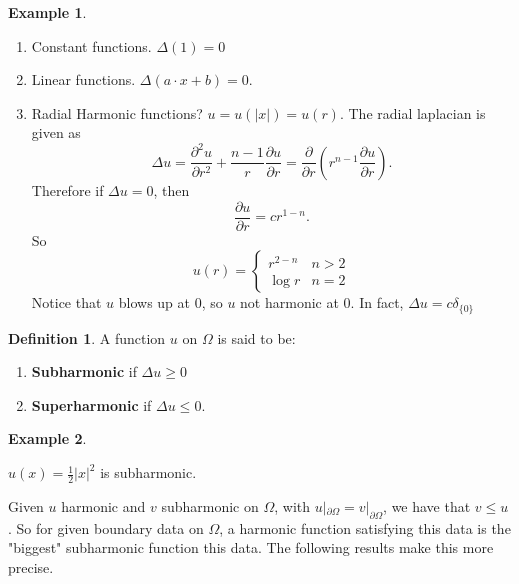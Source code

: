 \documentclass[12pt, a4paper]{article}
\theoremstyle{definition}
\newtheorem{defn}{Definition}
\newtheorem{example}{Example}
\newcommand{\bd}{\partial}
\begin{document}
\begin{tcolorbox}[colback = white]
\begin{example}
\end{example}
	\begin{enumerate}[label = \roman*)]
		\item 	Constant functions. $\Delta (1) = 0$
\item 	Linear functions. $\Delta( a\cdot x + b) = 0$. 
\item Radial Harmonic functions? $u = u(|x|)= u(r)$. The radial laplacian is given as
	$$ \Delta u = \frac{ \partial^2 u}{ \partial r^2 } + \frac{ n-1 }{ r } \frac{ \partial u }{ \partial r } = \frac{ \partial  }{ \partial r } \left( r^{n-1} \frac{ \partial u  }{ \partial r } \right). $$ 
Therefore if $\Delta u = 0$, then 
			$$ \frac{ \partial u  }{ \partial r  }= cr^{1-n} .$$
So 
			$$ u(r) = \begin{cases}
				r^{2-n} & n>2
				 \\ \log r & n=2
			\end{cases} $$ 
Notice that $u$ blows up at $0$, so $u$ not harmonic at $0$. In fact, $\Delta u = c \delta_{\{0\}}$ 
	\end{enumerate}
\end{tcolorbox}
\begin{tcolorbox}[colback = white]
\begin{defn}
A function $u$ on $\Omega$ is said to be: 
\begin{enumerate}[label = \roman*)]
	\item  \textbf{Subharmonic} if $\Delta u \geq 0$
	\item \textbf{Superharmonic} if $\Delta u \leq 0$. 
\end{enumerate}
\end{defn}
\end{tcolorbox}
\begin{tcolorbox}[colback = white]
\begin{example}
\end{example} $u(x) = \frac{ 1 }{ 2 }|x|^2$ is subharmonic. 
\end{tcolorbox}
Given $u$ harmonic and $v$ subharmonic on $\Omega$, with $u|_{\bd \Omega} = v|_{\bd \Omega}$, we have that $v \leq u$. So for given boundary data on $\Omega$, a harmonic function satisfying this data is the "biggest" subharmonic function this data. The following results make this more precise. 
\end{document}
